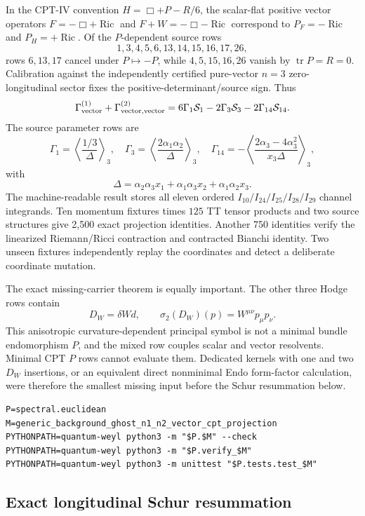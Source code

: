 \documentclass[11pt]{article}
\theoremstyle{definition}
\theoremstyle{remark}
\begin{document}
In the CPT-IV convention $H=\Box+P-R/6$, the scalar-flat positive vector
operators $F=-\Box+\operatorname{Ric}$ and
$F+W=-\Box-\operatorname{Ric}$ correspond to
$P_F=-\operatorname{Ric}$ and $P_H=+\operatorname{Ric}$.  Of the $P$-dependent source rows
\[
 1,3,4,5,6,13,14,15,16,17,26,
\]
rows $6,13,17$ cancel under $P\mapsto-P$, while $4,5,15,16,26$ vanish by
$\operatorname{tr}P=R=0$.  Calibration against the independently certified pure-vector
$n=3$ zero-longitudinal sector fixes the positive-determinant/source sign.
Thus
\[
 \Gamma^{(1)}_{\rm vector}+\Gamma^{(2)}_{\rm vector,vector}
 =6\Gamma_1\mathcal S_1-2\Gamma_3\mathcal S_3
  -2\Gamma_{14}\mathcal S_{14}.
\]
The source parameter rows are
\[
 \Gamma_1=\left\langle\frac{1/3}{\Delta}\right\rangle_3,
 \quad
 \Gamma_3=\left\langle\frac{2\alpha_1\alpha_2}{\Delta}\right\rangle_3,
 \quad
 \Gamma_{14}=
 -\left\langle\frac{2\alpha_3-4\alpha_3^2}{x_3\Delta}\right\rangle_3,
\]
with
\[
 \Delta=\alpha_2\alpha_3x_1+
        \alpha_1\alpha_3x_2+
        \alpha_1\alpha_2x_3.
\]
The machine-readable result stores all eleven ordered
$I_{10}/I_{24}/I_{25}/I_{28}/I_{29}$ channel integrands.  Ten momentum
fixtures times $125$ TT tensor products and two source structures give 2,500
exact projection identities.  Another 750 identities verify the linearized
Riemann/Ricci contraction and contracted Bianchi identity.  Two unseen
fixtures independently replay the coordinates and detect a deliberate
coordinate mutation.

The exact missing-carrier theorem is equally important.  The other three
Hodge rows contain
\[
 D_W=\delta Wd,
 \qquad \sigma_2(D_W)(p)=W^{\mu\nu}p_\mu p_\nu.
\]
This anisotropic curvature-dependent principal symbol is not a minimal
bundle endomorphism $P$, and the mixed row couples scalar and vector
resolvents.  Minimal CPT $P$ rows cannot evaluate them.  Dedicated kernels
with one and two $D_W$ insertions, or an equivalent direct nonminimal Endo
form-factor calculation, were therefore the smallest missing input before
the Schur resummation below.

\begin{verbatim}
P=spectral.euclidean
M=generic_background_ghost_n1_n2_vector_cpt_projection
PYTHONPATH=quantum-weyl python3 -m "$P.$M" --check
PYTHONPATH=quantum-weyl python3 -m "$P.verify_$M"
PYTHONPATH=quantum-weyl python3 -m unittest "$P.tests.test_$M"
\end{verbatim}

\subsection{Exact longitudinal Schur resummation}
\end{document}
